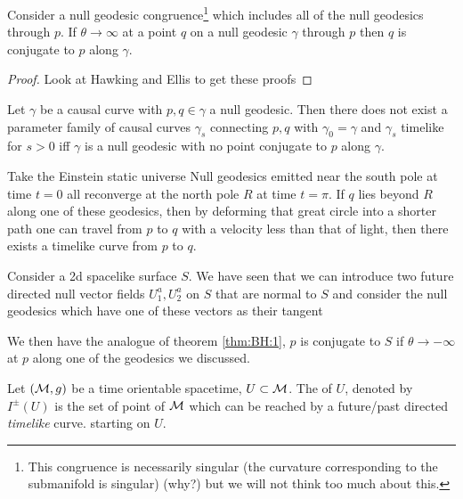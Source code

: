 \documentclass{article}
\begin{document}
\begin{theorem}\label{thm:BH:1}
Consider a null geodesic congruence\footnote{This congruence is necessarily singular (the curvature corresponding to the submanifold is singular) (why?) but we will not think too much about this. } which includes all of the null geodesics through $p$. If $\theta \to \infty$ at a point $q$ on a null geodesic $\gamma$ through $p$ then $q$ is conjugate to $p$ along $\gamma$. 
\end{theorem}
\begin{proof}
Look at Hawking and Ellis to get these proofs
\end{proof}

\begin{theorem}
Let $\gamma$ be a causal curve with $p, q \in \gamma$ a null geodesic. Then there does not exist a  parameter family of causal curves $\gamma_s$ connecting $p,q$ with $\gamma_0 = \gamma$ and $\gamma_s$ timelike for $ s > 0$ iff $\gamma$ is a null geodesic with no point conjugate to $p$ along $\gamma$. 
\end{theorem}

\begin{example}
Take the Einstein static universe 
Null geodesics emitted near the south pole at time $t=0$ all reconverge at the north pole $R$ at time $t= \pi$. If $q$ lies beyond $R$ along one of these geodesics, then by deforming that great circle into a shorter path one can travel from $p$ to $q$ with a velocity less than that of light, then there exists a timelike curve from $p$ to $q$. 
\end{example}

Consider a 2d spacelike surface $S$. We have seen that we can introduce two future directed null vector fields $U_1^a, U_2^a$ on $S$ that are normal to $S$ and consider the null geodesics which have one of these vectors as their tangent 

We then have the analogue of theorem \ref{thm:BH:1}, $p$ is conjugate to $S$ if $\theta\to -\infty$ at $p$ along one of the geodesics we discussed. 

\begin{definition}
Let $(\mathcal{M},g)$ be a time orientable spacetime, $U\subset \mathcal{M}$. The  of $U$, denoted by $I^\pm(U)$ is the set of point of $\mathcal{M}$ which can be reached by a future/past directed \emph{timelike} curve. starting on $U$. 
\end{definition}
\end{document}

